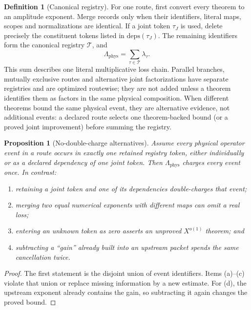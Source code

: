\documentclass[11pt]{article}
\newtheorem{proposition}[theorem]{Proposition}
\theoremstyle{definition}
\newtheorem{definition}[theorem]{Definition}
\theoremstyle{remark}
\newcommand{\Lam}{\Lambda_{\mathrm{phys}}}
\begin{document}
\begin{definition}[Canonical registry]
\label{def:registry}
For one route, first convert every theorem to an amplitude exponent.
Merge records only when their identifiers, literal maps, scopes and
normalizations are identical.  If a joint token \(\tau_J\) is used,
delete precisely the constituent tokens listed in
\(\mathrm{deps}(\tau_J)\).  The remaining identifiers form the
canonical registry \(\mathcal T\), and
\[
 \Lam=\sum_{\tau\in\mathcal T}\lambda_\tau.
\]
This sum describes one literal multiplicative loss chain.  Parallel
branches, mutually exclusive routes and alternative joint
factorizations have separate registries and are optimized routewise;
they are not added unless a theorem identifies them as factors in the
same physical composition.
When different theorems bound the same physical event, they are
alternative evidence, not additional events: a declared route selects
one theorem-backed bound (or a proved joint improvement) before
summing the registry.
\end{definition}

\begin{proposition}[No-double-charge alternatives]
\label{prop:registry}
Assume every physical operator event in a route occurs in exactly
one retained registry token, either individually or as a declared
dependency of one joint token.  Then \(\Lam\) charges every event
once.  In contrast:
\begin{enumerate}[label=(\alph*),leftmargin=2em]
\item retaining a joint token and one of its dependencies
  double-charges that event;
\item merging two equal numerical exponents with different maps can
  omit a real loss;
\item entering an unknown token as zero asserts an unproved
  \(X^{o(1)}\) theorem; and
\item subtracting a ``gain'' already built into an upstream packet
  spends the same cancellation twice.
\end{enumerate}
\end{proposition}

\begin{proof}
The first statement is the disjoint union of event identifiers.
Items (a)--(c) violate that union or replace missing information by a
new estimate.  For (d), the upstream exponent already contains the
gain, so subtracting it again changes the proved bound.
\end{proof}
\end{document}
